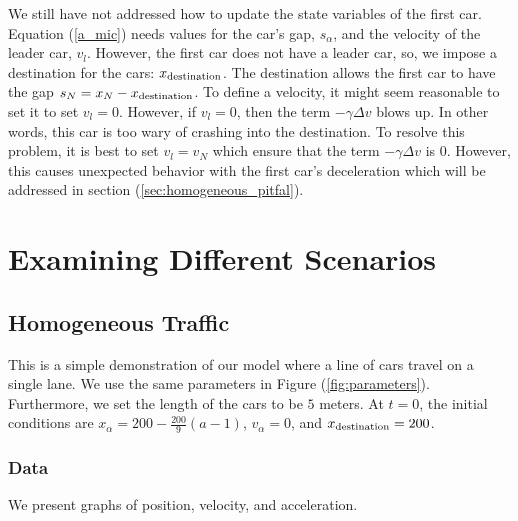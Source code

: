 \documentclass[12pt]{article}
\begin{document}
    We still have not addressed how to update the state variables of the first car. 
    Equation (\ref{a_mic}) needs values for the car's gap, $s_\alpha$, and the velocity of the leader car, $v_l$. 
    However, the first car does not have a leader car, so, we impose a destination for the cars: $x_{\rm destination}$. 
    The destination allows the first car to have the gap $s_{N} = x_{N} - x_{\rm destination}$. 
    To define a velocity, it might seem reasonable to set it to set $v_l = 0$. 
    However, if $v_l=0$, then the term $-\gamma \Delta v$ blows up. 
    In other words, this car is too wary of crashing into the destination. 
    To resolve this problem, it is best to set $v_l = v_{N}$ which ensure that the term $-\gamma \Delta v$ is $0$. 
    However, this causes unexpected behavior with the first car's deceleration which will be addressed in section (\ref{sec:homogeneous_pitfal}). 
    
    
    \section{Examining Different Scenarios}
    \subsection{Homogeneous Traffic}\label{sec:homogeneous}

    This is a simple demonstration of our model where a line of cars travel on a single lane. We use the same parameters in Figure (\ref{fig:parameters}). Furthermore, we set the length of the cars to be $5$ meters. At $t=0$, the initial conditions are $x_\alpha = 
    200-\frac{200}{9}\left(a-1\right)$, $v_\alpha = 0$, and $x_{\rm destination} = 200$.

    \subsubsection{Data}
    We present graphs of position, velocity, and acceleration.
    
\end{document}

